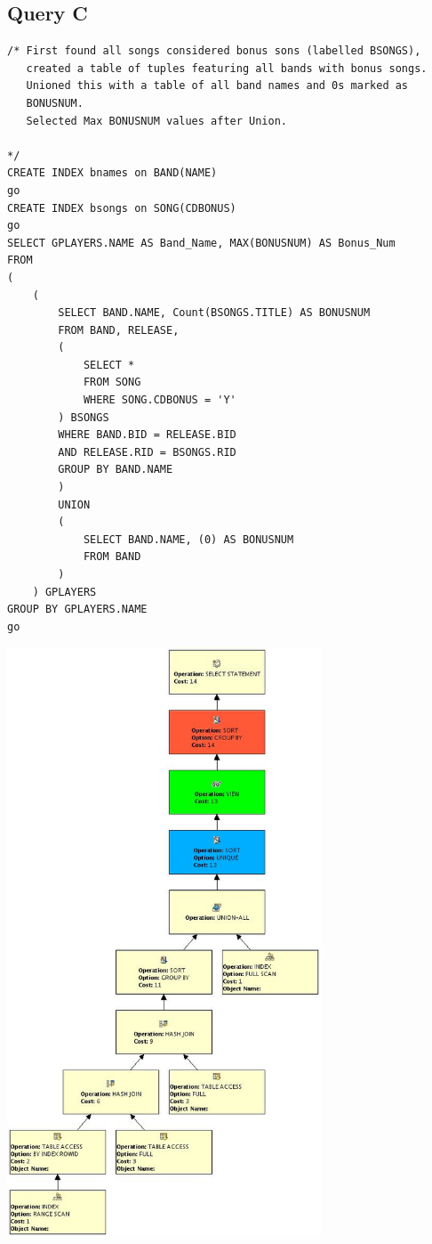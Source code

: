 \documentclass{report}
\begin{document}
\subsection*{Query C}
\begin{verbatim}
/* First found all songs considered bonus sons (labelled BSONGS),
   created a table of tuples featuring all bands with bonus songs.
   Unioned this with a table of all band names and 0s marked as
   BONUSNUM.
   Selected Max BONUSNUM values after Union.

*/
CREATE INDEX bnames on BAND(NAME)
go
CREATE INDEX bsongs on SONG(CDBONUS)
go
SELECT GPLAYERS.NAME AS Band_Name, MAX(BONUSNUM) AS Bonus_Num
FROM
(
    (
        SELECT BAND.NAME, Count(BSONGS.TITLE) AS BONUSNUM
        FROM BAND, RELEASE, 
        (
            SELECT *
            FROM SONG
            WHERE SONG.CDBONUS = 'Y'
        ) BSONGS
        WHERE BAND.BID = RELEASE.BID
        AND RELEASE.RID = BSONGS.RID
        GROUP BY BAND.NAME
        ) 
        UNION 
        ( 
            SELECT BAND.NAME, (0) AS BONUSNUM
            FROM BAND
        )
    ) GPLAYERS
GROUP BY GPLAYERS.NAME
go
\end{verbatim}
\includegraphics[width=0.7\textwidth]{Q2C}
\end{document}
